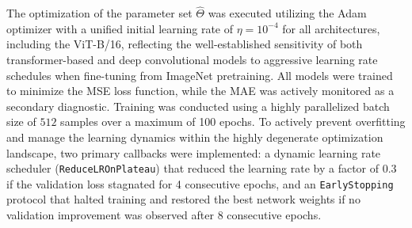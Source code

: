 \documentclass[a4paper,fleqn]{cas-sc}
\begin{document}
\begin{table}[pos=htbp]
\centering
\caption{Configuration of evaluated deep learning 
architectures for inverse Hamiltonian parameter 
estimation. All models share a standardized regularized 
regression head mapped to the $\breve{P}=8$-dimensional 
physical parameter space. BN: Batch Normalization; 
Drop($p$): Dropout with rate $p$.}
\label{tab:model_config}
\end{table}

The optimization of the parameter set $\hat{\Theta}$ 
was executed utilizing the Adam optimizer with a 
unified initial learning rate of $\eta = 10^{-4}$ 
for all architectures, including the ViT-B/16, 
reflecting the well-established sensitivity of both 
transformer-based and deep convolutional models to 
aggressive learning rate schedules when fine-tuning 
from ImageNet pretraining. All models were trained 
to minimize the MSE loss function, while the MAE 
was actively monitored as a secondary diagnostic. 
Training was conducted using a highly parallelized 
batch size of $512$ samples over a maximum of 
100 epochs. To actively prevent overfitting and 
manage the learning dynamics within the highly 
degenerate optimization landscape, two primary 
callbacks were implemented: a dynamic learning 
rate scheduler (\texttt{ReduceLROnPlateau}) that 
reduced the learning rate by a factor of 0.3 if 
the validation loss stagnated for 4 consecutive 
epochs, and an \texttt{EarlyStopping} protocol 
that halted training and restored the best network 
weights if no validation improvement was observed 
after 8 consecutive epochs.
\end{document}
